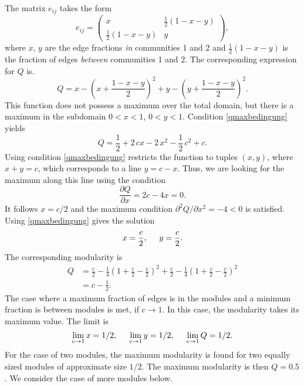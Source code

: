 \documentclass[openright,twoside,headsepline]{scrbook}
\begin{document}
The matrix $e_{ij}$ takes the form
\[
e_{ij}=\left(\begin{array}{cc}x & \frac{1}{2}(1-x-y) \\ \frac{1}{2}(1-x-y) & y\end{array}\right) ,
\]
where $x$, $y$ are the edge fractions \emph{in} communities 1 and 2 and $\frac{1}{2}(1-x-y)$ is the fraction of edges \emph{between} communities 1 and 2.
The corresponding expression for $Q$ is.
\[
Q=x-\left( x+\frac{1-x-y}{2} \right) ^2 +y -\left( y+\frac{1-x-y}{2} \right) ^2 .
\]
This function does not possess a maximum over the total domain, but there is a maximum in the subdomain $0<x<1$, $ 0<y<1$.
Condition \eqref{qmaxbedingung} yields
\[
Q=\frac{1}{2}+2\, cx-2\, x^2-\frac{1}{2}\, c^2+c.
\]
Using condition \eqref{qmaxbedingung} restricts the function to tuples $(x,y)$, where $x+y=c$, which corresponds to a line $y=c-x$.
Thus, we are looking for the maximum along this line using the condition
\[
\frac{\partial Q}{\partial x}=2c-4x=0.
\]
It follows $x=c/2$ and the maximum condition $\partial ^2 Q/\partial x^2 =-4<0$ is satisfied.
Using \eqref{qmaxbedingung} gives the solution
\begin{equation}\label{qmax_xy}
x=\frac{c}{2} , \hspace{0.5cm} y=\frac{c}{2}.
\end{equation}
The corresponding modularity is 
\begin{align*}
Q&=\frac{c}{2}-\frac{1}{4}\left( 1+\frac{c}{2}-\frac{c}{2} \right) ^2 +\frac{c}{2}-\frac{1}{4}\left( 1+\frac{c}{2}-\frac{c}{2} \right) ^2 \\
&= c- \frac{1}{2} .
\end{align*}
The case where a maximum fraction of edges is in the modules and a minimum fraction is between modules is met, if $c\rightarrow 1$.
In this case, the modularity takes its maximum value.
The limit is
\begin{equation}\label{q2limits}
\lim _{c\rightarrow 1} x =1/2, \hspace{0.5cm}\lim _{c\rightarrow 1} y =1/2, \hspace{0.5cm} \lim _{c\rightarrow 1} Q=1/2.
\end{equation}
For the case of two modules, the maximum modularity is found for two equally sized modules of approximate size $1/2$.
The maximum modularity is then $Q=0.5$.
We consider the case of more modules below.

%
\end{document}
